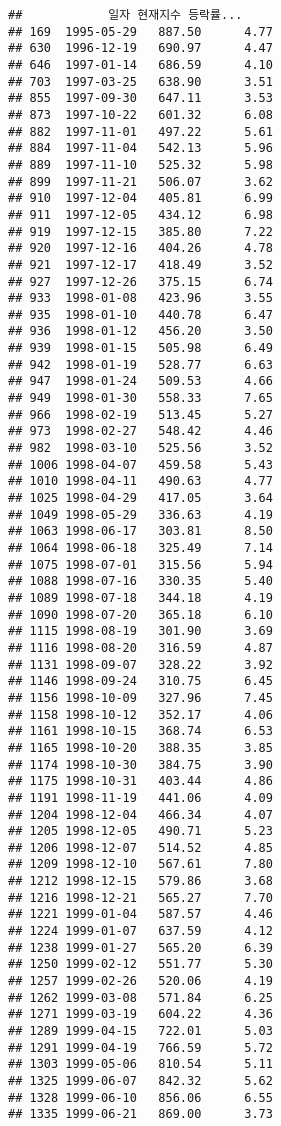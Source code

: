 \documentclass[]{article}
\begin{document}
\begin{verbatim}
##            일자 현재지수 등락률...
## 169  1995-05-29   887.50      4.77
## 630  1996-12-19   690.97      4.47
## 646  1997-01-14   686.59      4.10
## 703  1997-03-25   638.90      3.51
## 855  1997-09-30   647.11      3.53
## 873  1997-10-22   601.32      6.08
## 882  1997-11-01   497.22      5.61
## 884  1997-11-04   542.13      5.96
## 889  1997-11-10   525.32      5.98
## 899  1997-11-21   506.07      3.62
## 910  1997-12-04   405.81      6.99
## 911  1997-12-05   434.12      6.98
## 919  1997-12-15   385.80      7.22
## 920  1997-12-16   404.26      4.78
## 921  1997-12-17   418.49      3.52
## 927  1997-12-26   375.15      6.74
## 933  1998-01-08   423.96      3.55
## 935  1998-01-10   440.78      6.47
## 936  1998-01-12   456.20      3.50
## 939  1998-01-15   505.98      6.49
## 942  1998-01-19   528.77      6.63
## 947  1998-01-24   509.53      4.66
## 949  1998-01-30   558.33      7.65
## 966  1998-02-19   513.45      5.27
## 973  1998-02-27   548.42      4.46
## 982  1998-03-10   525.56      3.52
## 1006 1998-04-07   459.58      5.43
## 1010 1998-04-11   490.63      4.77
## 1025 1998-04-29   417.05      3.64
## 1049 1998-05-29   336.63      4.19
## 1063 1998-06-17   303.81      8.50
## 1064 1998-06-18   325.49      7.14
## 1075 1998-07-01   315.56      5.94
## 1088 1998-07-16   330.35      5.40
## 1089 1998-07-18   344.18      4.19
## 1090 1998-07-20   365.18      6.10
## 1115 1998-08-19   301.90      3.69
## 1116 1998-08-20   316.59      4.87
## 1131 1998-09-07   328.22      3.92
## 1146 1998-09-24   310.75      6.45
## 1156 1998-10-09   327.96      7.45
## 1158 1998-10-12   352.17      4.06
## 1161 1998-10-15   368.74      6.53
## 1165 1998-10-20   388.35      3.85
## 1174 1998-10-30   384.75      3.90
## 1175 1998-10-31   403.44      4.86
## 1191 1998-11-19   441.06      4.09
## 1204 1998-12-04   466.34      4.07
## 1205 1998-12-05   490.71      5.23
## 1206 1998-12-07   514.52      4.85
## 1209 1998-12-10   567.61      7.80
## 1212 1998-12-15   579.86      3.68
## 1216 1998-12-21   565.27      7.70
## 1221 1999-01-04   587.57      4.46
## 1224 1999-01-07   637.59      4.12
## 1238 1999-01-27   565.20      6.39
## 1250 1999-02-12   551.77      5.30
## 1257 1999-02-26   520.06      4.19
## 1262 1999-03-08   571.84      6.25
## 1271 1999-03-19   604.22      4.36
## 1289 1999-04-15   722.01      5.03
## 1291 1999-04-19   766.59      5.72
## 1303 1999-05-06   810.54      5.11
## 1325 1999-06-07   842.32      5.62
## 1328 1999-06-10   856.06      6.55
## 1335 1999-06-21   869.00      3.73

\end{verbatim}
\end{document}
